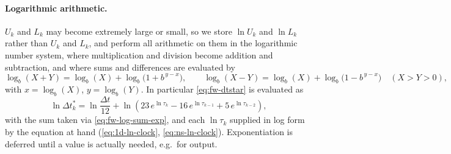 \paragraph{Logarithmic arithmetic.}
$U_k$ and $L_k$ may become extremely large or small, so we store
$\ln U_k$ and $\ln L_k$ rather than $U_k$ and $L_k$, and perform all
arithmetic on them in the logarithmic number system, where multiplication and
division become addition and subtraction, and where sums and differences are
evaluated by
\begin{equation}\label{eq:fw-log-sum-exp}
  \log_b(X+Y) = \log_b(X) + \log_b\!\bigl(1+b^{\,y-x}\bigr),
  \qquad
  \log_b(X-Y) = \log_b(X) + \log_b\!\bigl(1-b^{\,y-x}\bigr) \quad (X>Y>0),
\end{equation}
with $x = \log_b(X)$, $y = \log_b(Y)$. In particular
\eqref{eq:fw-dtstar} is evaluated as
\begin{equation}\label{eq:fw-ln-dtstar}
  \ln \Delta t_k^* = \ln\frac{\Delta t}{12}
  + \ln\!\left( 23\, e^{\ln \tau_k} - 16\, e^{\ln \tau_{k-1}} + 5\, e^{\ln \tau_{k-2}} \right),
\end{equation}
with the sum taken via \eqref{eq:fw-log-sum-exp}, and each $\ln \tau_k$
supplied in log form by the equation at hand
(\eqref{eq:1d-ln-clock}, \eqref{eq:ns-ln-clock}). Exponentiation is deferred
until a value is actually needed, e.g.\ for output.
